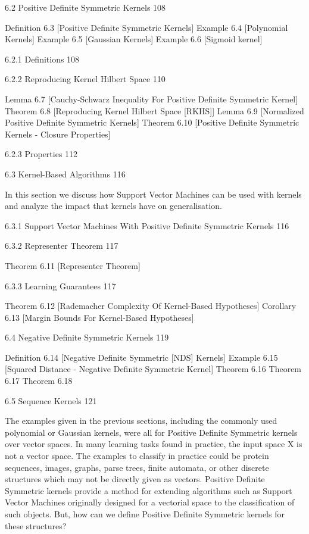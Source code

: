 6.2 Positive Definite Symmetric Kernels 108

Definition 6.3 [Positive Definite Symmetric Kernels]
Example 6.4 [Polynomial Kernels]
Example 6.5 [Gaussian Kernels]
Example 6.6 [Sigmoid kernel]

6.2.1 Definitions 108



6.2.2 Reproducing Kernel Hilbert Space 110

Lemma 6.7 [Cauchy-Schwarz Inequality For Positive Definite Symmetric Kernel]
Theorem 6.8 [Reproducing Kernel Hilbert Space [RKHS]]
Lemma 6.9 [Normalized Positive Definite Symmetric Kernels]
Theorem 6.10 [Positive Definite Symmetric Kernels - Closure Properties]

6.2.3 Properties 112



6.3 Kernel-Based Algorithms 116

In this section we discuss how Support Vector Machines can be used with kernels and analyze the impact that kernels have on generalisation.

6.3.1 Support Vector Machines With Positive Definite Symmetric Kernels 116



6.3.2 Representer Theorem 117

Theorem 6.11 [Representer Theorem]

6.3.3 Learning Guarantees 117

Theorem 6.12 [Rademacher Complexity Of Kernel-Based Hypotheses]
Corollary 6.13 [Margin Bounds For Kernel-Based Hypotheses]

6.4 Negative Definite Symmetric Kernels 119

Definition 6.14 [Negative Definite Symmetric [NDS] Kernels]
Example 6.15 [Squared Distance - Negative Definite Symmetric Kernel]
Theorem 6.16
Theorem 6.17
Theorem 6.18

6.5 Sequence Kernels 121

The examples given in the previous sections, including the commonly used polynomial or Gaussian kernels, were all for Positive Definite Symmetric kernels over vector spaces. In many learning tasks found in practice, the input space X is not a vector space. The examples to classify in practice could be protein sequences, images, graphs, parse trees, finite automata, or other discrete structures which may not be directly given as vectors. Positive Definite Symmetric kernels provide a method for extending algorithms such as Support Vector Machines originally designed for a vectorial space to the classification of such objects. But, how can we define Positive Definite Symmetric kernels for these structures?

